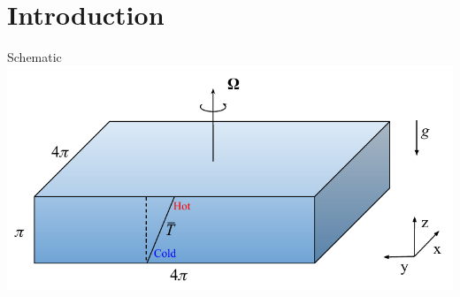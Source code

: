 \documentclass{beamer}
\begin{document}
\section{Introduction}


\begin{frame}{Schematic}
    \includegraphics[width = \textwidth]{images/schematic.pdf}

\end{frame}
\end{document}
